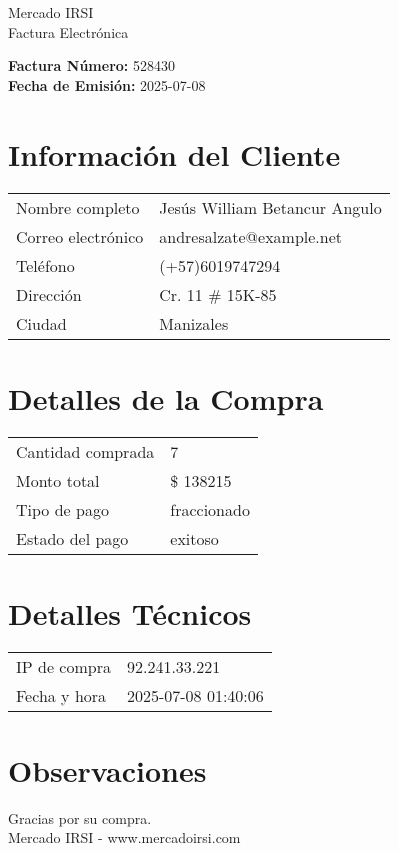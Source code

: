 \documentclass[12pt]{article}
\begin{document}
\begin{center}
    \Huge Mercado IRSI \\
    \Large Factura Electrónica
\end{center}

\vspace{0.5cm}

\noindent \textbf{Factura Número:} 528430 \\
\textbf{Fecha de Emisión:} 2025-07-08

\vspace{0.5cm}

\section*{Información del Cliente}
\begin{longtable}{ll}
Nombre completo & Jesús William Betancur Angulo \\
Correo electrónico & andresalzate@example.net \\
Teléfono & (+57)6019747294 \\
Dirección & Cr. 11 \# 15K-85 \\
Ciudad & Manizales \\
\end{longtable}

\vspace{0.5cm}

\section*{Detalles de la Compra}
\begin{longtable}{ll}
Cantidad comprada & 7 \\
Monto total & \$ 138215 \\
Tipo de pago & fraccionado \\
Estado del pago & exitoso \\
\end{longtable}

\vspace{0.5cm}

\section*{Detalles Técnicos}
\begin{longtable}{ll}
IP de compra & 92.241.33.221 \\
Fecha y hora & 2025-07-08 01:40:06 \\
\end{longtable}

\vspace{0.5cm}

\section*{Observaciones}


\vspace{0.5cm}

\begin{center}
    Gracias por su compra. \\
    Mercado IRSI - www.mercadoirsi.com
\end{center}
\end{document}
